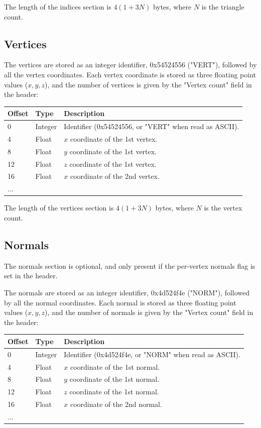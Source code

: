 The length of the indices section is $4(1+3N)$ bytes, where $N$ is the triangle
count.

\subsection{Vertices}
The vertices are stored as an integer identifier, 0x54524556 ("VERT"), followed
by all the vertex coordinates. Each vertex coordinate is stored as three
floating point values ($x,y,z$), and the number of vertices is given by the
"Vertex count" field in the header:

\begin{tabular}{|l|l|l|}\hline
\textbf{Offset} &  \textbf{Type} & \textbf{Description}\\ \hline
0 & Integer & Identifier (0x54524556, or "VERT" when read as ASCII).\\ \hline
4 & Float & $x$ coordinate of the 1st vertex.\\ \hline
8 & Float & $y$ coordinate of the 1st vertex.\\ \hline
12 & Float & $z$ coordinate of the 1st vertex.\\ \hline
16 & Float & $x$ coordinate of the 2nd vertex.\\ \hline
... & & \\ \hline
\end{tabular}

The length of the vertices section is $4(1+3N)$ bytes, where $N$ is the vertex
count.

\subsection{Normals}
The normals section is optional, and only present if the per-vertex normals
flag is set in the header.

The normals are stored as an integer identifier, 0x4d524f4e ("NORM"), followed
by all the normal coordinates. Each normal is stored as three floating point
values ($x,y,z$), and the number of normals is given by the "Vertex count" field
in the header:

\begin{tabular}{|l|l|l|}\hline
\textbf{Offset} &  \textbf{Type} & \textbf{Description}\\ \hline
0 & Integer & Identifier (0x4d524f4e, or "NORM" when read as ASCII).\\ \hline
4 & Float & $x$ coordinate of the 1st normal.\\ \hline
8 & Float & $y$ coordinate of the 1st normal.\\ \hline
12 & Float & $z$ coordinate of the 1st normal.\\ \hline
16 & Float & $x$ coordinate of the 2nd normal.\\ \hline
... & & \\ \hline
\end{tabular}

